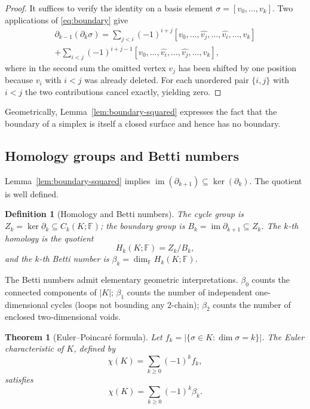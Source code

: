 \documentclass[onluarkali,ingilizce,yukseklisans,karton,LisansustuEgitim]{itutez}
\newtheorem{definition}{Definition}[chapter]
\newtheorem{theorem}{Theorem}[chapter]
\DeclareMathOperator{\im}{im}
\providecommand{\F}{\mathbb{F}}
\providecommand{\1}{\mathbf{1}}
\begin{document}
\begin{proof}
It suffices to verify the identity on a basis element $\sigma=[v_0,\ldots,v_k]$. Two applications of \eqref{eq:boundary} give
\begin{multline*}
  \partial_{k-1}(\partial_k\sigma)
  =\sum_{j<i}(-1)^{i+j}[v_0,\ldots,\widehat{v_j},\ldots,\widehat{v_i},\ldots,v_k]\\
  +\sum_{i<j}(-1)^{i+j-1}[v_0,\ldots,\widehat{v_i},\ldots,\widehat{v_j},\ldots,v_k],
\end{multline*}
where in the second sum the omitted vertex $v_j$ has been shifted by one position because $v_i$ with $i<j$ was already deleted. For each unordered pair $\{i,j\}$ with $i<j$ the two contributions cancel exactly, yielding zero.
\end{proof}

Geometrically, Lemma~\ref{lem:boundary-squared} expresses the fact that the boundary of a simplex is itself a closed surface and hence has no boundary.

\subsection{Homology groups and Betti numbers}

Lemma~\ref{lem:boundary-squared} implies $\im(\partial_{k+1})\subseteq\ker(\partial_k)$. The quotient is well defined.

\begin{definition}[Homology and Betti numbers]
\label{def:homology}
The \emph{cycle group} is $Z_k=\ker\partial_k\subseteq C_k(K;\F)$; the \emph{boundary group} is $B_k=\im\partial_{k+1}\subseteq Z_k$. The \emph{$k$-th homology} is the quotient
\[
  H_k(K;\F)=Z_k/B_k,
\]
and the \emph{$k$-th Betti number} is $\beta_k=\dim_\F H_k(K;\F)$.
\end{definition}

The Betti numbers admit elementary geometric interpretations. $\beta_0$ counts the connected components of $|K|$; $\beta_1$ counts the number of independent one-dimensional cycles (loops not bounding any 2-chain); $\beta_2$ counts the number of enclosed two-dimensional voids.

\begin{theorem}[Euler--Poincar\'e formula]
\label{thm:euler}
Let $f_k=|\{\sigma\in K:\dim\sigma=k\}|$. The Euler characteristic of $K$, defined by
\[
  \chi(K)=\sum_{k\geq 0}(-1)^k f_k,
\]
satisfies
\begin{equation}
  \chi(K)=\sum_{k\geq 0}(-1)^k\beta_k.
  \label{eq:euler}
\end{equation}
\end{theorem}
\end{document}
